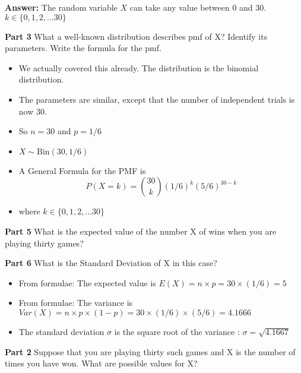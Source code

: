 \bigskip

\noindent \textbf{Answer: }The random variable $X$ can take any value between 0 and 30.  $k \in \{0,1,2,\ldots 30\}$



\noindent\textbf{Part 3} What a well-known distribution describes pmf of X? Identify its parameters. Write the formula
for the pmf.

\begin{itemize}
\item We actually covered this already. The distribution is the binomial distribution.
\item The parameters are similar, except that the number of independent trials is now 30.
\item So $n=30$  and $p = 1/6$
\item $X \sim \mbox{Bin}(30,1/6)$
\item A General Formula for the PMF is
\[P(X=k) =  { 30 \choose k} (1/6)^k (5/6)^{30-k}   \]
\item where $k \in \{0,1,2,\ldots 30 \}$
\end{itemize}








\noindent\textbf{Part 5} What is the expected value of the number X of wins when you are playing thirty games?\\

\bigskip

\noindent\textbf{Part 6} What is the Standard Deviation of X in this case?

\bigskip

\begin{itemize}
\item From formulae: The expected value is $E(X) = n\times p = 30 \times (1/6) = 5$
\item From formulae: The variance is $Var(X) = n\times p\times (1-p) = 30 \times (1/6) \times (5/6) = 4.1666$
\item The standard deviation $\sigma$ is the square root of the variance : $\sigma = \sqrt{4.1667}$
\end{itemize}


\newpage








\noindent\textbf{Part 2} Suppose that you are playing thirty such games and X is the number of times you have won.
What are possible values for X?


